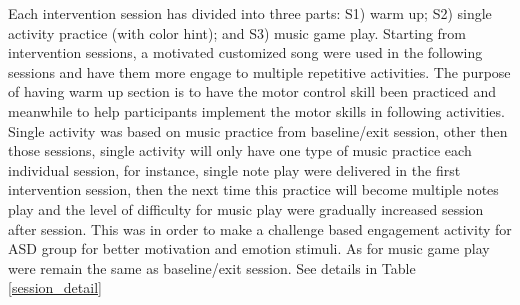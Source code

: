 Each intervention session has divided into three parts: S1) warm up; S2) single activity practice (with color hint); 
and S3) music game play. Starting from intervention sessions, a motivated customized song were used in the following 
sessions and have them more engage to multiple repetitive activities. 
The purpose of having warm up section is to have the motor control skill been practiced 
and meanwhile to help participants implement the motor skills in following activities. Single activity was 
based on music practice from baseline/exit session, other then those sessions, single activity will
only have one type of music practice each individual session, for instance, single note play were 
delivered in the first intervention session, then the next time this practice will become multiple notes 
play and the level of difficulty for music play were gradually increased session after session. This was in
order to make a challenge based engagement activity for ASD group for better motivation and emotion stimuli. 
As for music game play were remain the same as baseline/exit session. See details in Table \ref{session_detail}\\

